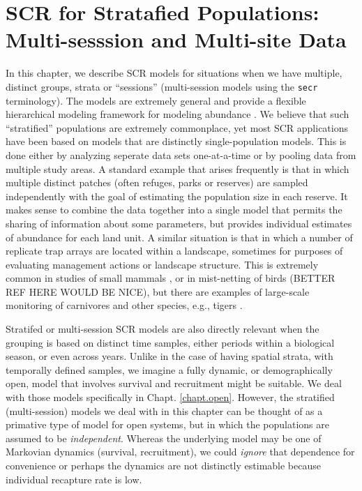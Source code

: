 \chapter{SCR for Stratafied Populations: 
Multi-sesssion and Multi-site Data}
\label{chapt.hscr}

\vspace{0.3cm}


In this chapter, we describe SCR models for situations when we have
multiple, distinct groups, strata or ``sessions'' (multi-session
models using the \mbox{\tt secr} terminology). The models are
extremely general and provide a flexible hierarchical modeling
framework for modeling abundance \citep{converse_royle:2012,
  royle_etal:2012arXiv}.  We believe that such ``stratified''
populations are extremely commonplace, yet most SCR applications have
been based on models that are distinctly single-population
models. This is done either by analyzing seperate data sets
one-at-a-time or by pooling data from multiple study areas.  A
standard example that arises frequently is that in which multiple
distinct patches (often refuges, parks or reserves) are sampled
independently with the goal of estimating the population size in each
reserve. It makes sense to combine the data together into a single
model that permits the sharing of information about some parameters,
but provides individual estimates of abundance for each land unit.  A
similar situation is that in which a number of replicate trap arrays
are located within a landscape, sometimes for purposes of evaluating
management actions or landscape structure. This is extremely common in
studies of small mammals \citep{converse_etal:2006jwm,
  converse_etal:2006ea, converse_royle:2012}, or in mist-netting of
birds \citep{desante_etal:1995} (BETTER REF HERE WOULD BE NICE), but
there are examples of large-scale monitoring of carnivores and other
species, e.g., tigers \citep{jhala_etal:2011}.


Stratifed or multi-session SCR models are also directly relevant when
the grouping is based on distinct time samples, either periods within
a biological season, or even across years. 
Unlike in the case of having spatial strata, with temporally defined
samples, we imagine a fully dynamic, or demographically open, model
that involves survival and recruitment might be suitable. We deal with
those models specifically in Chapt. \ref{chapt.open}.  However, the
stratified (multi-session) models we deal with in this chapter can be
thought of as a primative type of model for open systems, but in which
the populations are assumed to be {\it independent}. Whereas the
underlying model may be one of Markovian dynamics (survival,
recruitment), we could {\it ignore} that dependence for convenience or
perhaps the dynamics are not distinctly estimable because individual
recapture rate is low.


